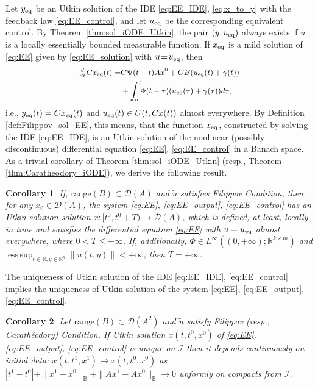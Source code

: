 \documentclass{article}
\newcommand{\R}{\mathbb{R}}
\newcommand{\B}{\mathbb{B}}
\newcommand{\D}{\mathcal{D}}
\newcommand{\range}{\mathrm{range}}
\newtheorem{corollary}{Corollary}
\DeclareMathOperator*{\esssup}{ess\,sup}
\begin{document}
{Let  $y_{\rm eq}$ be an Utkin solution of the IDE \eqref{eq:EE_IDE},  \eqref{eq:x_to_y} with the feedback law \eqref{eq:EE_control},
and let $u_{\rm eq}$ be the corresponding equivalent control. By Theorem \ref{thm:sol_iODE_Utkin}, the pair $(y_{\rm},u_{\rm eq})$  always exists if $\tilde u$ is a locally essentially bounded measurable function.  If $x_{\rm eq}$ is a mild solution of \eqref{eq:EE} given by \eqref{eq:EE_solution} with $u\!=\!u_{\rm eq}$, then\vspace{-1mm}
\[\small
\begin{split}
\tfrac{d}{dt}Cx_{\rm eq}(t)=&C\Psi(t-t)Ax^0+CB(u_{\rm eq}(t)+\gamma(t))\\
&+\int^t_{\sigma} \!\!\Phi(t-\tau)(u_{\rm eq}(\tau)+\gamma(\tau))d\tau,
\end{split}\vspace{-1mm}
\]
i.e., $y_{\rm eq}(t)=Cx_{\rm eq}(t)$ and $u_{\rm eq}(t)\in U(t,Cx(t))$ almost everywhere. By Definition \ref{def:Filippov_sol_EE}, this means,  that the function $x_{\rm eq}$, constructed by solving the IDE \eqref{eq:EE_IDE}, is an Utkin solution of the nonlinear (possibly discontinuous) differential equation \eqref{eq:EE}, \eqref{eq:EE_control} in a Banach space. As a trivial corollary of Theorem \ref{thm:sol_iODE_Utkin} (resp., Theorem \ref{thm:Caratheodory_iODE}), we derive the  following result.
 	\begin{corollary}\label{cor:Utkin_EE}\itshape
 		If, $\range(B)\subset \mathcal{D}(A)$ and $\tilde u$ satisfies    Filippov  Condition, then, for any $x_0\in \mathcal{D}(A)$,  the system \eqref{eq:EE}, \eqref{eq:EE_output}, \eqref{eq:EE_control} has an Utkin solution  solution $x :[t^0,t^0+T)\to \D(A)$, which is defined, at least, locally in time and  satisfies  the differential equation \eqref{eq:EE} with $u=u_{\rm eq}$ almost everywhere, where $0< T\leq +\infty$. If, additionally, $\Phi\in L^{\infty}((0,+\infty);\R^{k\times m})$  and 
 		$\esssup_{t\in \R,y\in \R^k}\|\tilde u(t,y)\|<+\infty$, then $T=+\infty$.
 	\end{corollary}
The uniqueness of Utkin solution of the IDE \eqref{eq:EE_IDE}, \eqref{eq:EE_control}
 implies the uniqueness of Utkin solution of the system \eqref{eq:EE}, \eqref{eq:EE_output}, \eqref{eq:EE_control}.
 	\begin{corollary}\itshape 
 		Let $\range(B)\subset \mathcal{D}(A^2)$ and $\tilde u$ satisfy Filippov (resp., Carath\'eodory) Condition. If Utkin  solution $x(t,t^0,x^0)$ of  \eqref{eq:EE}, \eqref{eq:EE_output}, \eqref{eq:EE_control} is  unique  on $\mathcal{I}$ then it depends continuously on initial data: $x(t,t^1,x^1)\to x(t,t^0,x^0)$ as $|t^1-t^0|+\|x^1-x^0\|_{\B}+\|Ax^1-Ax^0\|_{\B}\to 0$ unformly on compacts from $\mathcal{I}$.

\end{corollary}}
\end{document}
